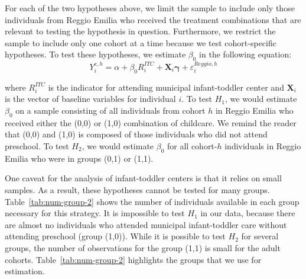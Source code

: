 For each of the two hypotheses above, we limit the sample to include only those individuals from Reggio Emilia who received the treatment combinations that are relevant to testing the hypothesis in question. Furthermore, we restrict the sample to include only one cohort at a time because we test cohort-specific hypotheses. To test these hypotheses, we estimate $\beta_{0}$ in the following equation:
\begin{equation}
Y_{i}^{c,h} = \alpha + \beta_{0}R_i^{ITC} + \mathbf{X}_i \bm{\gamma} + \varepsilon_{i}^{Reggio,h}
\end{equation}

where $R_i^{ITC}$ is the indicator for attending municipal infant-toddler center and $\mathbf{X}_i$ is the vector of baseline variables for individual $i$. To test $H_1$, we would estimate $\beta_0$ on a sample consisting of all individuals from cohort $h$ in Reggio Emilia who received either the (0,0) or (1,0) combination of childcare. We remind the reader that (0,0) and (1,0) is composed of those individuals who did not attend preschool. To test $H_2$, we would estimate $\beta_0$ for all cohort-$h$ individuals in Reggio Emilia who were in groups (0,1) or (1,1). 

One caveat for the analysis of infant-toddler centers is that it relies on small samples. As a result, these hypotheses cannot be tested for many groups. Table~\ref{tab:num-group-2} shows the number of individuals available in each group necessary for this strategy. It is impossible to test $H_1$ in our data, because there are almost no individuals who attended municipal infant-toddler care without attending preschool (group (1,0)). While it is possible to test $H_2$ for several groups, the number of observations for the group (1,1) is small for the adult cohorts. Table~\ref{tab:num-group-2} highlights the groups that we use for estimation. 



